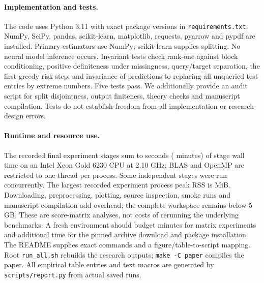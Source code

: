\documentclass{article}
\begin{document}
\paragraph{Implementation and tests.}
The code uses Python 3.11 with exact package versions in \texttt{requirements.txt}; NumPy, SciPy, pandas, scikit-learn, matplotlib, requests, pyarrow and pypdf are installed. Primary estimators use NumPy; scikit-learn supplies splitting. No neural model inference occurs. Invariant tests check rank-one against block conditioning, positive definiteness under missingness, query/target separation, the first greedy risk step, and invariance of predictions to replacing all unqueried test entries by extreme numbers. Five tests pass. We additionally provide an audit script for split disjointness, output finiteness, theory checks and manuscript compilation. Tests do not establish freedom from all implementation or research-design errors.

\paragraph{Runtime and resource use.}
The recorded final experiment stages sum to \ExperimentSeconds{} seconds (\ExperimentMinutes{} minutes) of stage wall time on an Intel Xeon Gold 6230 CPU at 2.10 GHz; BLAS and OpenMP are restricted to one thread per process. Some independent stages were run concurrently. The largest recorded experiment process peak RSS is \PeakMB{} MiB. Downloading, preprocessing, plotting, source inspection, smoke runs and manuscript compilation add overhead; the complete workspace remains below 5 GB. These are score-matrix analyses, not costs of rerunning the underlying benchmarks. A fresh environment should budget minutes for matrix experiments and additional time for the pinned archive download and package installation. The README supplies exact commands and a figure/table-to-script mapping. Root \texttt{run\_all.sh} rebuilds the research outputs; \texttt{make -C paper} compiles the paper. All empirical table entries and text macros are generated by \texttt{scripts/report.py} from actual saved runs.
\end{document}
